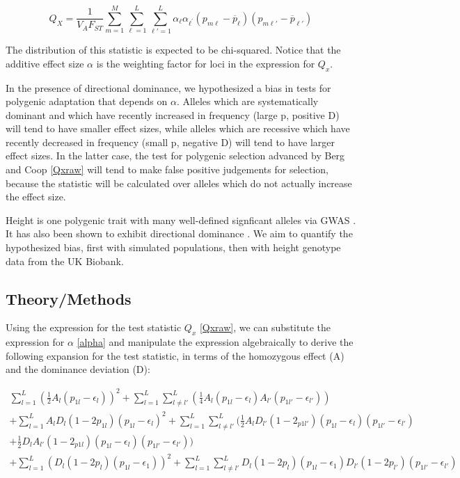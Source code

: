 \documentclass[a4paper,12pt]{article}
\begin{document}
\begin{equation} \label{Qxraw}
  Q_X = \frac{1}{V_A F_{ST}} \sum_{m=1}^M \sum_{\ell=1}^L \sum_{\ell\prime=1}^L \alpha_{\ell} \alpha_{\ell^{\prime}}\left(p_{m\ell} - \overline{p}_\ell \right)\left(p_{m \ell\prime} - \overline{p}_{\ell\prime}\right)
\end{equation}


The distribution of this statistic is expected to be chi-squared. Notice that the additive effect size $\alpha$ is the weighting factor for loci in the
expression for $Q_x$. 

In the presence of directional dominance, we hypothesized a bias in
tests for polygenic adaptation that depends on $\alpha$. Alleles which are systematically dominant and which have recently increased in
frequency (large p, positive D) will tend to have smaller effect sizes, while
alleles which are recessive which have recently decreased in frequency
(small p, negative D) will tend to have larger effect sizes. In the
latter case, the test for polygenic selection advanced by Berg and Coop
\eqref{Qxraw} will tend to make false positive judgements for
selection, because the statistic will be calculated over alleles which
do not actually increase the effect size.

Height is one polygenic trait with many well-defined signficant
alleles via GWAS \cite{heightselection}. It has also been shown to exhibit
directional dominance \cite{heightdirectdom}. We aim to quantify the
hypothesized bias, first with simulated populations, then with height genotype data from the UK Biobank.



\subsection*{Theory/Methods}

Using the expression for the test statistic $Q_x$ \eqref{Qxraw}, we
can substitute the expression for $\alpha$ \eqref{alpha} and manipulate
the expression algebraically to derive the following expansion for the
test statistic, in terms of the homozygous effect (A)  and the dominance
deviation (D):

\begin{equation}
  \begin{split}
  \sum^L_{l=1}( \frac{1}{2}A_l(p_{1l}-\epsilon_l))^2+\sum^L_{l=1}\sum^L_{
    l \neq l'}(\frac{1}{4}A_l(p_{1l}-\epsilon_{l})A_{l'}(p_{1l'}-\epsilon_{l'}))
  \\
  +\sum^L_{l=1}A_lD_l(1-2p_{1l})(p_{1l}-\epsilon_l)^2 +
  \sum^L_{l=1}\sum^L_{l \neq
    l'}(\frac{1}{2}A_lD_{l'}(1-2_{p1l'})(p_{1l}-\epsilon_l)(p_{1l'}-\epsilon_{l'}) \\
  + \frac{1}{2}D_lA_{l'}(1-2_{p1l})(p_{1l}-\epsilon_l)(p_{1l'}-\epsilon_{l'})) \\
   + \sum^L_{l=1} (D_l(1-2p_l)(p_{1l}-\epsilon_{1}))^2
   + \sum^L_{l=1}\sum^L_{l \neq
     l'}D_{l}(1-2p_{l})(p_{1l}-\epsilon_{1})D_{l'}(1-2p_{l'})(p_{1l'}-\epsilon_{l'}) \label{expansion}
  \end{split}
\end{equation}
\end{document}
